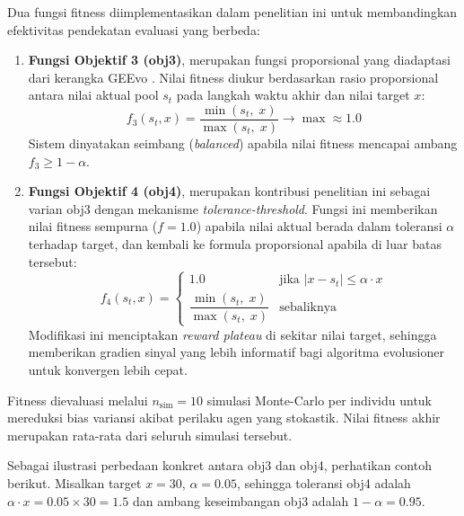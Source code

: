 Dua fungsi fitness diimplementasikan dalam penelitian ini untuk membandingkan efektivitas pendekatan evaluasi yang berbeda:

\begin{enumerate}
    \item \textbf{Fungsi Objektif 3 (obj3)}, merupakan fungsi proporsional yang diadaptasi dari kerangka GEEvo \citep{Rupp_2024}. Nilai fitness diukur berdasarkan rasio proporsional antara nilai aktual pool $s_t$ pada langkah waktu akhir dan nilai target $x$:
    \[
        f_3(s_t, x) = \frac{\min(s_t,\; x)}{\max(s_t,\; x)} \longrightarrow \max \approx 1.0
    \]
    Sistem dinyatakan seimbang (\textit{balanced}) apabila nilai fitness mencapai ambang $f_3 \geq 1 - \alpha$.

    \item \textbf{Fungsi Objektif 4 (obj4)}, merupakan kontribusi penelitian ini sebagai varian obj3 dengan mekanisme \textit{tolerance-threshold}. Fungsi ini memberikan nilai fitness sempurna ($f = 1.0$) apabila nilai aktual berada dalam toleransi $\alpha$ terhadap target, dan kembali ke formula proporsional apabila di luar batas tersebut:
    \[
        f_4(s_t, x) =
        \begin{cases}
            1.0 & \text{jika } |x - s_t| \leq \alpha \cdot x \\[4pt]
            \dfrac{\min(s_t,\; x)}{\max(s_t,\; x)} & \text{sebaliknya}
        \end{cases}
    \]
    Modifikasi ini menciptakan \textit{reward plateau} di sekitar nilai target, sehingga memberikan gradien sinyal yang lebih informatif bagi algoritma evolusioner untuk konvergen lebih cepat.
\end{enumerate}

Fitness dievaluasi melalui $n_{\text{sim}} = 10$ simulasi Monte-Carlo per individu untuk mereduksi bias variansi akibat perilaku agen yang stokastik. Nilai fitness akhir merupakan rata-rata dari seluruh simulasi tersebut.

Sebagai ilustrasi perbedaan konkret antara obj3 dan obj4, perhatikan contoh berikut. Misalkan target $x = 30$, $\alpha = 0.05$, sehingga toleransi obj4 adalah $\alpha \cdot x = 0.05 \times 30 = 1.5$ dan ambang keseimbangan obj3 adalah $1 - \alpha = 0.95$.


